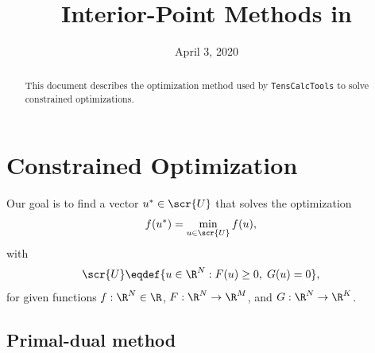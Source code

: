 \documentclass[11pt]{article}
\title{Interior-Point Methods in \TC}
\author{\jph}
\date{April 3, 2020 }
\newcommand{\TC}{\texttt{TensCalcTools}}
\begin{document}
                        \maketitle

\begin{abstract}
  This document describes the optimization method used by \TC{} to
  solve constrained optimizations.
\end{abstract}

\section{Constrained Optimization}
\label{sec:ipm-o}

Our goal is to find a vector $u^*\in\scr{U}$ that solves the
optimization
\begin{align}\label{eq:minimization}
  f(u^*)&=\min_{u\in\scr{U}} f(u), &
\end{align}
with
\begin{align*}
  \scr{U}&\eqdef\{u\in\R^{N}: F(u)\ge 0,\; G(u)=0\}, 
\end{align*}
for given functions $f:\R^{N}\in\R$, $F:\R^{N}\to\R^{M}$, and $G:\R^{N}\to\R^{K}$.


\subsection{Primal-dual method}
\end{document}
